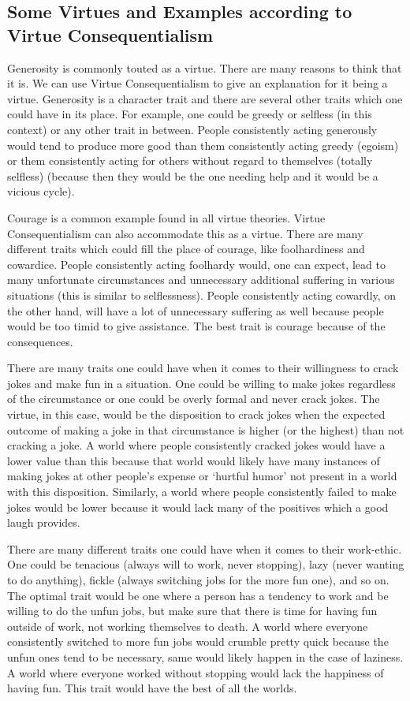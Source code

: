 \subsection{Some Virtues and Examples according to Virtue Consequentialism}

Generosity is commonly touted as a virtue. There are many reasons to think that it is. We can use Virtue Consequentialism to give an explanation for it being a virtue. Generosity is a character trait and there are several other traits which one could have in its place. For example, one could be greedy or selfless (in this context) or any other trait in between. People consistently acting generously would tend to produce more good than them consistently acting greedy (egoism) or them consistently acting for others without regard to themselves (totally selfless) (because then they would be the one needing help and it would be a vicious cycle). 

Courage is a common example found in all virtue theories. Virtue Consequentialism can also accommodate this as a virtue. There are many different traits which could fill the place of courage, like foolhardiness and cowardice. People consistently acting foolhardy would, one can expect, lead to many unfortunate circumstances and unnecessary additional suffering in various situations (this is similar to selflessness). People consistently acting cowardly, on the other hand, will have a lot of unnecessary suffering as well because people would be too timid to give assistance. The best trait is courage because of the consequences.    

There are many traits one could have when it comes to their willingness to crack jokes and make fun in a situation. One could be willing to make jokes regardless of the circumstance or one could be overly formal and never crack jokes. The virtue, in this case, would be the disposition to crack jokes when the expected outcome of making a joke in that circumstance is higher (or the highest) than not cracking a joke. A world where people consistently cracked jokes would have a lower value than this because that world would likely have many instances of making jokes at other people’s expense or ‘hurtful humor’ not present in a world with this disposition. Similarly, a world where people consistently failed to make jokes would be lower because it would lack many of the positives which a good laugh provides.

There are many different traits one could have when it comes to their work-ethic. One could be tenacious (always will to work, never stopping), lazy (never wanting to do anything), fickle (always switching jobs for the more fun one), and so on. The optimal trait would be one where a person has a tendency to work and be willing to do the unfun jobs, but make sure that there is time for having fun outside of work, not working themselves to death. A world where everyone consistently switched to more fun jobs would crumble pretty quick because the unfun ones tend to be necessary, same would likely happen in the case of laziness. A world where everyone worked without stopping would lack the happiness of having fun. This trait would have the best of all the worlds.
